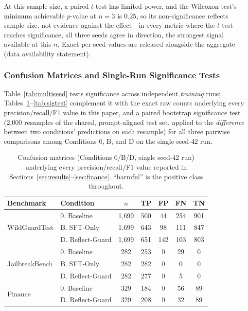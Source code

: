 \documentclass[superintelligence,article,submit,pdftex,moreauthors]{Definitions/mdpi}
\begin{document}
At this sample size, a paired $t$-test has limited power, and the Wilcoxon test's minimum achievable $p$-value at $n=3$ is $0.25$, so its non-significance reflects sample size, not evidence against the effect---in every metric where the $t$-test reaches significance, all three seeds agree in direction, the strongest signal available at this $n$. Exact per-seed values are released alongside the aggregate (data availability statement).

\subsubsection{Confusion Matrices and Single-Run Significance Tests}
\label{sec:confusion}

Table~\ref{tab:multiseed} tests significance across independent \emph{training} runs; Tables~\ref{tab:confusion}--\ref{tab:sigtest} complement it with the exact raw counts underlying every precision/recall/F1 value in this paper, and a paired bootstrap significance test (2{,}000 resamples of the shared, prompt-aligned test set, applied to the \emph{difference} between two conditions' predictions on each resample) for all three pairwise comparisons among Conditions 0, B, and D on the single seed-42 run.

\begin{table}[H]
  \caption{Confusion matrices (Conditions 0/B/D, single seed-42 run) underlying every precision/recall/F1 value reported in Sections~\ref{sec:results}--\ref{sec:finance}. ``harmful'' is the positive class throughout.\label{tab:confusion}}
  \centering
  \small
  \begin{tabular}{llccccc}
    \toprule
    Benchmark & Condition & $n$ & TP & FP & FN & TN \\
    \midrule
    \multirow{3}{*}{WildGuardTest}
    & 0. Baseline       & 1{,}699 & 500 & 44  & 254 & 901 \\
    & B. SFT-Only       & 1{,}699 & 643 & 98  & 111 & 847 \\
    & D. Reflect-Guard  & 1{,}699 & 651 & 142 & 103 & 803 \\
    \midrule
    \multirow{3}{*}{JailbreakBench}
    & 0. Baseline       & 282 & 253 & 0 & 29 & 0 \\
    & B. SFT-Only       & 282 & 282 & 0 & 0  & 0 \\
    & D. Reflect-Guard  & 282 & 277 & 0 & 5  & 0 \\
    \midrule
    \multirow{2}{*}{Finance}
    & 0. Baseline       & 329 & 184 & 0 & 56 & 89 \\
    & D. Reflect-Guard  & 329 & 208 & 0 & 32 & 89 \\
    \bottomrule
  \end{tabular}
\end{table}
\end{document}
